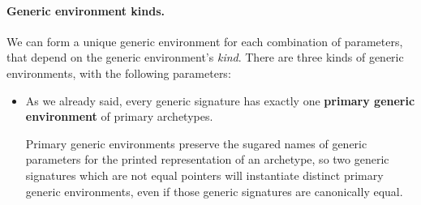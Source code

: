 \documentclass[../generics]{subfiles}
\begin{document}
\paragraph{Generic environment kinds.}
We can form a unique generic environment for each combination of parameters, that depend on the generic environment's \emph{kind}. There are three kinds of generic environments, with the following parameters:
\begin{itemize}
\item As we already said, every generic signature has exactly one \textbf{primary generic environment} of primary archetypes.
\begin{tightcenter}
\end{tightcenter}
Primary generic environments preserve the sugared names of generic parameters for the printed representation of an archetype, so two generic signatures which are not equal pointers will instantiate distinct primary generic environments, even if those generic signatures are canonically equal.


\end{itemize}
\end{document}
